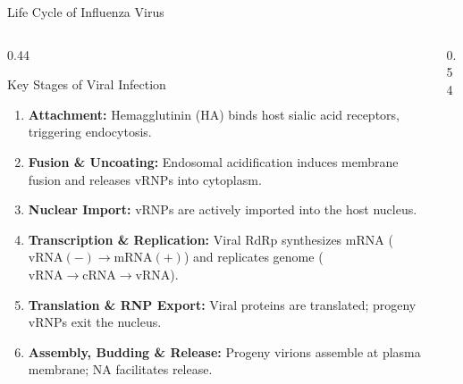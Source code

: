 \documentclass[aspectratio=169, 10pt]{beamer}
\begin{document}
\begin{frame}{Life Cycle of Influenza Virus}
  \begin{columns}[c]
    \begin{column}{0.44\textwidth}
      \begin{block}{Key Stages of Viral Infection}
        \footnotesize
        \begin{enumerate}
          \setlength\itemsep{0.25em}
          \item \textbf{Attachment:} Hemagglutinin (HA) binds host sialic acid receptors, triggering endocytosis.
          \item \textbf{Fusion \& Uncoating:} Endosomal acidification induces membrane fusion and releases vRNPs into cytoplasm.
          \item \textbf{Nuclear Import:} vRNPs are actively imported into the host nucleus.
          \item \textbf{Transcription \& Replication:} Viral RdRp synthesizes mRNA ($\text{vRNA}(-) \rightarrow \text{mRNA}(+)$) and replicates genome ($\text{vRNA} \rightarrow \text{cRNA} \rightarrow \text{vRNA}$).
          \item \textbf{Translation \& RNP Export:} Viral proteins are translated; progeny vRNPs exit the nucleus.
          \item \textbf{Assembly, Budding \& Release:} Progeny virions assemble at plasma membrane; NA facilitates release.
        \end{enumerate}
      \end{block}
    \end{column}

    \begin{column}{0.54\textwidth}
      \centering
\end{column}
\end{columns}
\end{frame}
\end{document}
